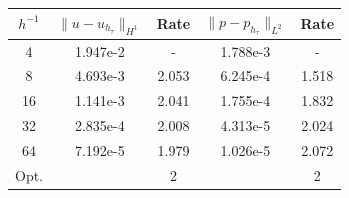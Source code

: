 \\
\begin{center} 
\centering
\begin{tabular}{c|c|c|c|c}
$h^{-1}$ & $\|u - u_{h_{\tau}}\|_{H^1}$ & Rate & $\|p - p_{h_{\tau}}\|_{L^2}$ & Rate\\\hline
4  & 1.947e-2 & -     & 1.788e-3 & - \\
8  & 4.693e-3 & 2.053 & 6.245e-4 & 1.518 \\
16 & 1.141e-3 & 2.041 & 1.755e-4 & 1.832 \\
32 & 2.835e-4 & 2.008 & 4.313e-5 & 2.024 \\
64 & 7.192e-5 & 1.979 & 1.026e-5 & 2.072 \\\hline
Opt. & & 2 & & 2 
\end{tabular}
 \label{tab:biot_default_space_error}
\end{center}

